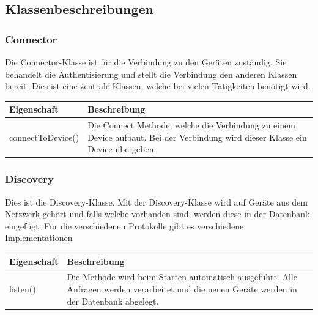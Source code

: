 \subsection{Klassenbeschreibungen}
\subsubsection{Connector}
Die Connector-Klasse ist für die Verbindung zu den Geräten zuständig. Sie behandelt die Authentisierung und stellt die Verbindung den anderen Klassen bereit. Dies ist eine zentrale Klassen, welche bei vielen Tätigkeiten benötigt wird.
\begin{table}[H]
\centering
    \begin{tabular}{@{}l p{14.1cm} @{}}\toprule    
    {Eigenschaft} & {Beschreibung}\\ \midrule
    connectToDevice() & Die Connect Methode, welche die Verbindung zu einem Device aufbaut. Bei der Verbindung wird dieser Klasse ein Device übergeben.\\
    \bottomrule
    \end{tabular}
\end{table}


\subsubsection{Discovery}
Dies ist die Discovery-Klasse. Mit der Discovery-Klasse wird auf Geräte aus dem Netzwerk gehört und falls welche vorhanden sind, werden diese in der Datenbank eingefügt. Für die verschiedenen Protokolle gibt es verschiedene Implementationen
\begin{table}[H]
\centering
    \begin{tabular}{@{}l p{14.1cm} @{}}\toprule    
    {Eigenschaft} & {Beschreibung}\\ \midrule
    listen() &  Die Methode wird beim Starten automatisch ausgeführt. Alle Anfragen werden verarbeitet und die neuen Geräte werden in der Datenbank abgelegt.\\
    \bottomrule
    \end{tabular}
\end{table}




